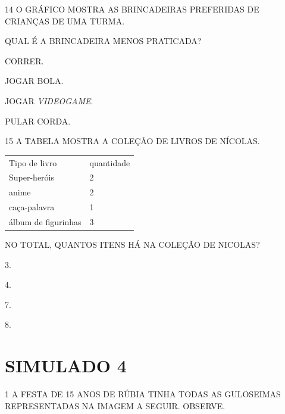 \num{14} O GRÁFICO MOSTRA AS BRINCADEIRAS PREFERIDAS DE CRIANÇAS DE UMA TURMA.


QUAL É A BRINCADEIRA MENOS PRATICADA?

\begin{escolha}
\item CORRER.

\item JOGAR BOLA.

\item JOGAR \textit{VIDEOGAME}.

\item PULAR CORDA.
\end{escolha}


\num{15} A TABELA MOSTRA A COLEÇÃO DE LIVROS DE NÍCOLAS.

\begin{longtable}[]{@{}ll@{}}
\toprule
Tipo de livro & quantidade\tabularnewline
Super-heróis & 2\tabularnewline
anime & 2\tabularnewline
caça-palavra & 1\tabularnewline
álbum de figurinhas & 3\tabularnewline
\bottomrule
\end{longtable}

NO TOTAL, QUANTOS ITENS HÁ NA COLEÇÃO DE NICOLAS?

\begin{escolha}
\item 3.

\item 4.

\item 7.

\item 8.
\end{escolha}


\chapter{SIMULADO 4}

\num{1} A FESTA DE 15 ANOS DE RÚBIA TINHA TODAS AS GULOSEIMAS REPRESENTADAS
NA IMAGEM A SEGUIR. OBSERVE.

